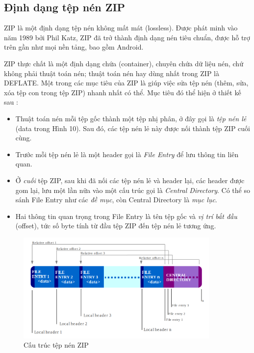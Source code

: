 \documentclass[../../thesis]{subfiles}
\begin{document}
\subsection{Định dạng tệp nén ZIP}

ZIP là một định dạng tệp nén không mất mát (lossless). Được phát minh vào năm
1989 bởi Phil Katz, ZIP đã trở thành định dạng nén tiêu chuẩn, được hỗ trợ trên
gần như mọi nền tảng, bao gồm Android.

ZIP thực chất là một định dạng chứa (container), chuyên chứa dữ liệu nén, chứ
không phải thuật toán nén; thuật toán nén hay dùng nhất trong ZIP là DEFLATE.
Một trong các mục tiêu của ZIP là giúp việc sửa tệp nén (thêm, sửa, xóa tệp con
trong tệp ZIP) nhanh nhất có thể. Mục tiêu đó thể hiện ở thiết kế sau
\cite{PKWARE_APPNOTE}:

\begin{itemize}
    \item
        Thuật toán nén mỗi tệp gốc thành một tệp nhị phân, ở đây gọi là
        \emph{tệp nén lẻ} (data trong Hình 10). Sau đó, các tệp nén lẻ này được
        nối thành tệp ZIP cuối cùng.
    \item
        Trước mỗi tệp nén lẻ là một header gọi là \emph{File Entry} để lưu thông
        tin liên quan.
    \item
        Ở \emph{cuối} tệp ZIP, sau khi đã nối các tệp nén lẻ và header lại, các
        header được gom lại, lưu một lần nữa vào một cấu trúc gọi là
        \emph{Central Directory}. Có thể so sánh File Entry như các \emph{đề
        mục}, còn Central Directory là \emph{mục lục}.
    \item
        Hai thông tin quan trọng trong File Entry là tên tệp gốc và \emph{vị trí
        bắt đầu} (offset), tức số byte tính từ đầu tệp ZIP đến tệp nén lẻ tương
        ứng.
\end{itemize}

\begin{figure}[H]
    \centering
    \includegraphics[width=10cm]
        {../images/ZIP-64_Internal_Layout.png}
    \caption{Cấu trúc tệp nén ZIP \cite{WIKI_ZIP}}
    \label{fig:zip_layout}
\end{figure}
\end{document}
